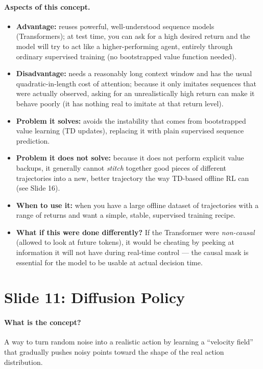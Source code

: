 \documentclass[11pt]{article}
\begin{document}
\paragraph{Aspects of this concept.}
\begin{itemize}
\item \textbf{Advantage:} reuses powerful, well-understood sequence models
(Transformers); at test time, you can ask for a high desired return and the model will
try to act like a higher-performing agent, entirely through ordinary supervised training
(no bootstrapped value function needed).
\item \textbf{Disadvantage:} needs a reasonably long context window and has the usual
quadratic-in-length cost of attention; because it only imitates sequences that were
actually observed, asking for an unrealistically high return can make it behave poorly
(it has nothing real to imitate at that return level).
\item \textbf{Problem it solves:} avoids the instability that comes from bootstrapped
value learning (TD updates), replacing it with plain supervised sequence prediction.
\item \textbf{Problem it does not solve:} because it does not perform explicit value
backups, it generally cannot \emph{stitch} together good pieces of different
trajectories into a new, better trajectory the way TD-based offline RL can (see Slide
16).
\item \textbf{When to use it:} when you have a large offline dataset of trajectories
with a range of returns and want a simple, stable, supervised training recipe.
\item \textbf{What if this were done differently?} If the Transformer were
\emph{non-causal} (allowed to look at future tokens), it would be cheating by peeking at
information it will not have during real-time control --- the causal mask is essential
for the model to be usable at actual decision time.
\end{itemize}

\section{Slide 11: Diffusion Policy}

\paragraph{What is the concept?}
A way to turn random noise into a realistic action by learning a ``velocity field'' that
gradually pushes noisy points toward the shape of the real action distribution.
\end{document}

